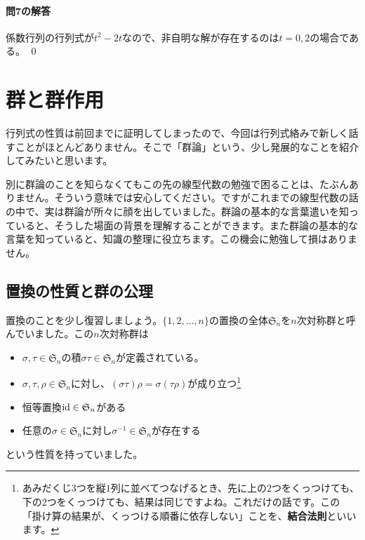 \paragraph{問7の解答}
係数行列の行列式が$t^2 - 2t$なので、非自明な解が存在するのは$t = 0, 2$の場合である。 \qed

\section{群と群作用}

行列式の性質は前回までに証明してしまったので、今回は行列式絡みで新しく話すことがほとんどありません。そこで「群論」という、少し発展的なことを紹介してみたいと思います。

別に群論のことを知らなくてもこの先の線型代数の勉強で困ることは、たぶんありません。そういう意味では安心してください。ですがこれまでの線型代数の話の中で、実は群論が所々に顔を出していました。群論の基本的な言葉遣いを知っていると、そうした場面の背景を理解することができます。また群論の基本的な言葉を知っていると、知識の整理に役立ちます。この機会に勉強して損はありません。

\subsection{置換の性質と群の公理}

置換のことを少し復習しましょう。$\{1, 2, \ldots, n\}$の置換の全体$\mathfrak{S}_n$を$n$次対称群と呼んでいました。この$n$次対称群は
\begin{itemize}
\item $\sigma, \tau \in \mathfrak{S}_n$の積$\sigma \tau \in \mathfrak{S}_n$が定義されている。
\item $\sigma, \tau, \rho \in \mathfrak{S}_n$に対し、$(\sigma \tau)\rho = \sigma (\tau \rho)$が成り立つ\footnote{あみだくじ$3$つを縦$1$列に並べてつなげるとき、先に上の$2$つをくっつけても、下の$2$つをくっつけても、結果は同じですよね。これだけの話です。この「掛け算の結果が、くっつける順番に依存しない」ことを、\textbf{結合法則}といいます。}
\item 恒等置換$\operatorname{id} \in \mathfrak{S}_n$がある
\item 任意の$\sigma \in \mathfrak{S}_n$に対し$\sigma^{-1} \in \mathfrak{S}_n$が存在する
\end{itemize}
という性質を持っていました。

